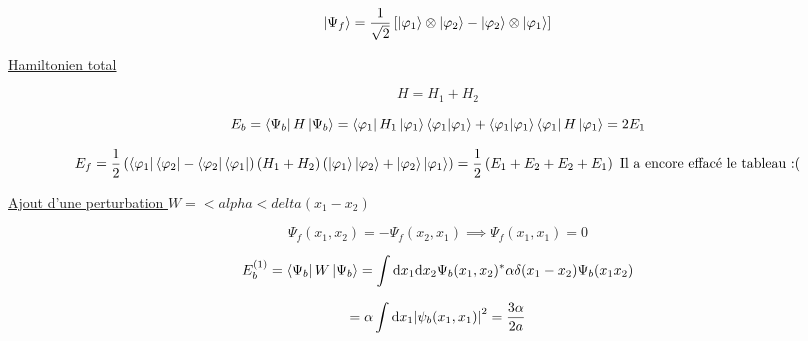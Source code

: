 $$\ket{\Psi_f} = \frac{1}{\sqrt{2}} \left[ \ket{\varphi_1} \otimes \ket{\varphi_2} -\ket{\varphi_2} \otimes \ket{\varphi_1} \right] $$ 

\underline{Hamiltonien total}  

$$H = H_{1} + H_2$$ 

$$E_{b} = \bra{\Psi_b} H \ket{\Psi_{b} } = \bra{\varphi_1} H_1\ket{\varphi_1}\braket{\varphi_1} +\braket{\varphi_1}\bra{\varphi_1}H\ket{\varphi_1} = 2 E_1$$ 

$$E_{f} = \frac{1}{2} \left( \bra{\varphi_1}\bra{\varphi_2} -\bra{\varphi_2}\bra{\varphi_1} \right) (H_{1} + H_{2} ) \left( \ket{\varphi_1} \ket{\varphi_2} + \ket{\varphi_2}\ket{\varphi_1} \right)  = \frac{1}{2} \left( E_{1} + E_{2} +E_{2} +E_{1}  \right) \text{ Il a encore effacé le tableau :(} $$ 

\underline{Ajout d'une perturbation $W = <alpha <delta(x_{1} - x_{2} )$ }  


$$\Psi_f(x_{1}, x_{2}) = -\Psi_{f} (x_{2} ,x_{1} )\implies \Psi_f(x_{1} ,x_1) =0$$ 


$$E_{b}^{(1)} = \bra{\Psi_b} W \ket{\Psi_b} = \int\dd x_{1} \dd x_{2} \Psi_{b} (x_{1} ,x_{2} )^* \alpha \delta(x_{1} -x_{2} ) \Psi_{b} (x_{1} x_{2} )$$ 

$$=\alpha \int \dd x_{1} \abs{\psi_{b} (x_{1}, x_{1} )}^2 = \frac{3\alpha}{2a} $$ 
 


	

